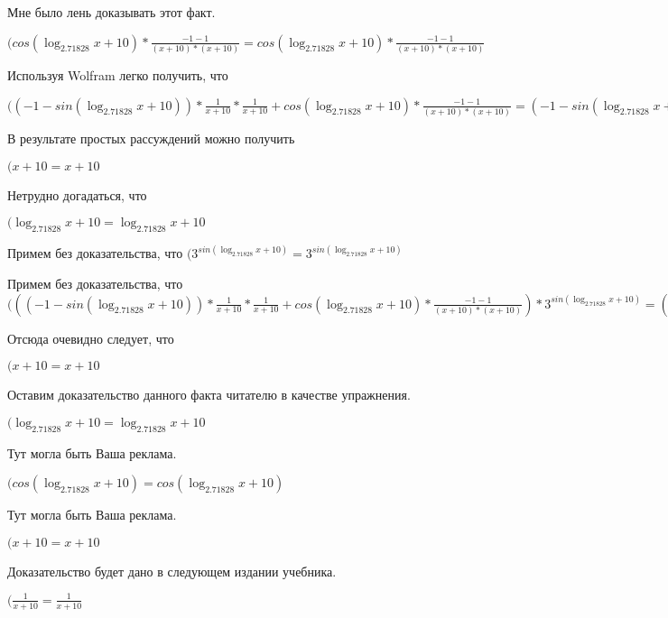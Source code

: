 \documentclass[12pt,a4paper,fleqn]{article}
\theoremstyle{definition}
\begin{document}
Мне было лень доказывать этот факт.

$(cos(\log_{ 2.71828 }{ x  +  10 }) * \frac{ -1  -  1 }{( x  +  10 ) * ( x  +  10 )}
 = cos(\log_{ 2.71828 }{ x  +  10 }) * \frac{ -1  -  1 }{( x  +  10 ) * ( x  +  10 )}
$

Используя Wolfram легко получить, что

$(( -1  - sin(\log_{ 2.71828 }{ x  +  10 })) * \frac{ 1 }{ x  +  10 }
 * \frac{ 1 }{ x  +  10 }
 + cos(\log_{ 2.71828 }{ x  +  10 }) * \frac{ -1  -  1 }{( x  +  10 ) * ( x  +  10 )}
 = ( -1  - sin(\log_{ 2.71828 }{ x  +  10 })) * \frac{ 1 }{ x  +  10 }
 * \frac{ 1 }{ x  +  10 }
 + cos(\log_{ 2.71828 }{ x  +  10 }) * \frac{ -1  -  1 }{( x  +  10 ) * ( x  +  10 )}
$

В результате простых рассуждений можно получить

$( x  +  10  =  x  +  10 $

Нетрудно догадаться, что

$(\log_{ 2.71828 }{ x  +  10 } = \log_{ 2.71828 }{ x  +  10 }$

Примем без доказательства, что
$({ 3 }^{sin(\log_{ 2.71828 }{ x  +  10 })} = { 3 }^{sin(\log_{ 2.71828 }{ x  +  10 })}$

Примем без доказательства, что
$((( -1  - sin(\log_{ 2.71828 }{ x  +  10 })) * \frac{ 1 }{ x  +  10 }
 * \frac{ 1 }{ x  +  10 }
 + cos(\log_{ 2.71828 }{ x  +  10 }) * \frac{ -1  -  1 }{( x  +  10 ) * ( x  +  10 )}
) * { 3 }^{sin(\log_{ 2.71828 }{ x  +  10 })} = (( -1  - sin(\log_{ 2.71828 }{ x  +  10 })) * \frac{ 1 }{ x  +  10 }
 * \frac{ 1 }{ x  +  10 }
 + cos(\log_{ 2.71828 }{ x  +  10 }) * \frac{ -1  -  1 }{( x  +  10 ) * ( x  +  10 )}
) * { 3 }^{sin(\log_{ 2.71828 }{ x  +  10 })}$

Отсюда очевидно следует, что

$( x  +  10  =  x  +  10 $

Оставим доказательство данного факта читателю в качестве упражнения.

$(\log_{ 2.71828 }{ x  +  10 } = \log_{ 2.71828 }{ x  +  10 }$

Тут могла быть Ваша реклама.

$(cos(\log_{ 2.71828 }{ x  +  10 }) = cos(\log_{ 2.71828 }{ x  +  10 })$

Тут могла быть Ваша реклама.

$( x  +  10  =  x  +  10 $

Доказательство будет дано в следующем издании учебника.

$(\frac{ 1 }{ x  +  10 }
 = \frac{ 1 }{ x  +  10 }
$
\end{document}
